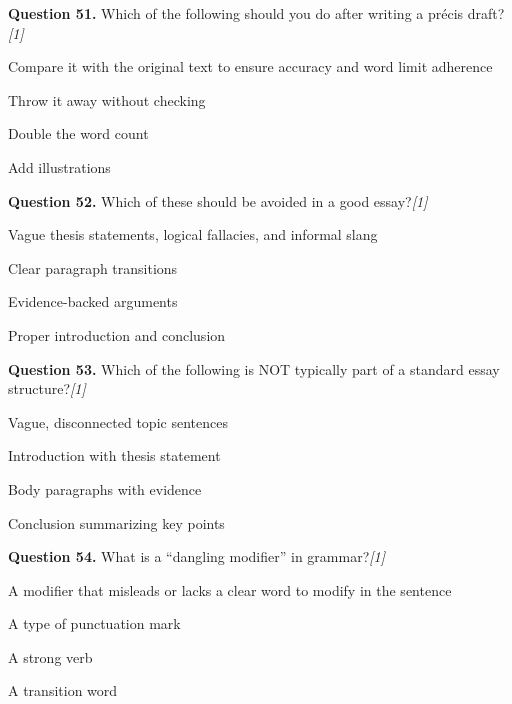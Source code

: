 \documentclass[11pt,a4paper]{article}
\newcommand{\pts}[1]{\hfill   \textit{[#1]}}
\begin{document}
\medskip




\noindent   \textbf{Question 51.} Which of the following should you do after writing a précis draft?\pts{1}

\begin{parts}
  \item Compare it with the original text to ensure accuracy and word limit adherence
  \item Throw it away without checking
  \item Double the word count
  \item Add illustrations
\end{parts}

\medskip




\noindent   \textbf{Question 52.} Which of these should be avoided in a good essay?\pts{1}

\begin{parts}
  \item Vague thesis statements, logical fallacies, and informal slang
  \item Clear paragraph transitions
  \item Evidence-backed arguments
  \item Proper introduction and conclusion
\end{parts}

\medskip




\noindent   \textbf{Question 53.} Which of the following is NOT typically part of a standard essay structure?\pts{1}

\begin{parts}
  \item Vague, disconnected topic sentences
  \item Introduction with thesis statement
  \item Body paragraphs with evidence
  \item Conclusion summarizing key points
\end{parts}

\medskip




\noindent   \textbf{Question 54.} What is a ``dangling modifier'' in grammar?\pts{1}

\begin{parts}
  \item A modifier that misleads or lacks a clear word to modify in the sentence
  \item A type of punctuation mark
  \item A strong verb
  \item A transition word
\end{parts}
\end{document}
